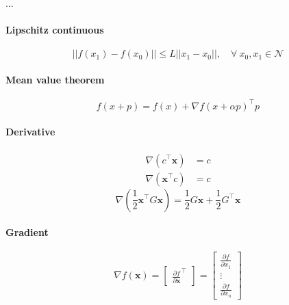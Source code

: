 
...

\sepline

\paragraph{Lipschitz continuous}
\begin{equation}
  || f(x_1) - f(x_0) || \leq L || x_1 - x_0 ||, \quad \forall \: x_0, x_1 \in \mathcal{N}
\end{equation}

\paragraph{Mean value theorem}
\begin{equation}
  f(x+p) = f(x) + \nabla f(x + \alpha p)^\top p
\end{equation}


\paragraph{Derivative}
\begin{equation}
\begin{split}
  \nabla(c^\top \mathbf{x}) &= c\\
  \nabla(\mathbf{x}^\top c) &= c
\end{split}
\end{equation}
%
\begin{equation}
  \nabla \left( \frac{1}{2} \mathbf{x}^\top G \mathbf{x} \right) = \frac{1}{2}G \mathbf{x} + \frac{1}{2}G^\top \mathbf{x}
\end{equation}

\paragraph{Gradient}
\begin{equation}
  \nabla f(\mathbf{x}) = \begin{bmatrix} \frac{\partial f}{\partial \mathbf{x}}^\top \end{bmatrix}
  = \begin{bmatrix}
  \frac{\partial f}{\partial x_1}\\
  \vdots\\
  \frac{\partial f}{\partial x_n}
  \end{bmatrix}
\end{equation}

